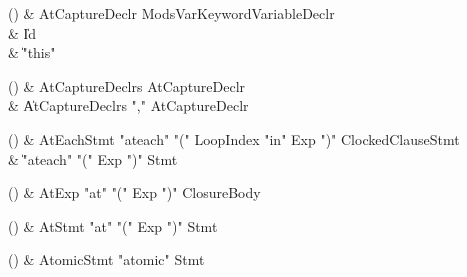 \begin{bbgrammarappendix}{3.6in}

() & AtCaptureDeclr \label{prod:AtCaptureDeclr}  \: Mods\opt VarKeyword\opt VariableDeclr  \\

 &    \| Id \\
 &    \| \xcd"this" \\

\end{bbgrammarappendix}

\begin{bbgrammarappendix}{3.5in}

() & AtCaptureDeclrs \label{prod:AtCaptureDeclrs}  \: AtCaptureDeclr  \\

 &    \| AtCaptureDeclrs \xcd"," AtCaptureDeclr \\

\end{bbgrammarappendix}

\begin{bbgrammarappendix}{4.0in}

() & AtEachStmt \label{prod:AtEachStmt}  \: \xcd"ateach" \xcd"(" LoopIndex \xcd"in" Exp \xcd")" ClockedClause\opt Stmt  \\

 &    \| \xcd"ateach" \xcd"(" Exp \xcd")" Stmt \\

\end{bbgrammarappendix}

\begin{bbgrammarappendix}{4.5in}

() & AtExp \label{prod:AtExp}  \: \xcd"at" \xcd"(" Exp \xcd")" ClosureBody  \\


\end{bbgrammarappendix}

\begin{bbgrammarappendix}{4.4in}

() & AtStmt \label{prod:AtStmt}  \: \xcd"at" \xcd"(" Exp \xcd")" Stmt  \\


\end{bbgrammarappendix}

\begin{bbgrammarappendix}{4.0in}

() & AtomicStmt \label{prod:AtomicStmt}  \: \xcd"atomic" Stmt  \\


\end{bbgrammarappendix}

